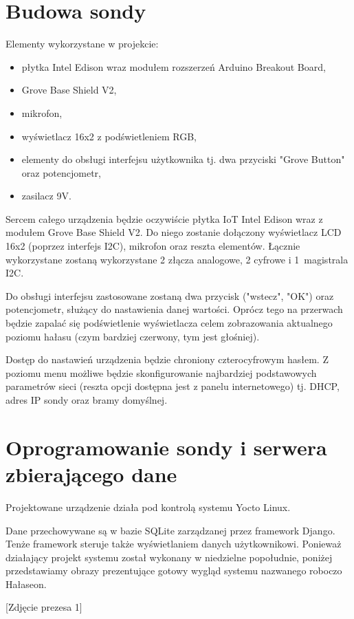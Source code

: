 \documentclass[12pt, a4paper]{article}
\begin{document}
\section{Budowa sondy}

Elementy wykorzystane w projekcie:
\begin{itemize}
\item płytka Intel Edison wraz modułem rozszerzeń Arduino Breakout Board,
\item Grove Base Shield V2,
\item mikrofon,
\item wyświetlacz 16x2 z podświetleniem RGB,
\item elementy do obsługi interfejsu użytkownika tj. dwa przyciski "Grove Button" oraz potencjometr,
\item zasilacz 9V.
\end{itemize}

Sercem całego urządzenia będzie oczywiście płytka IoT Intel Edison wraz z modułem Grove Base Shield V2. Do niego zostanie dołączony wyświetlacz LCD 16x2 (poprzez interfejs I2C), mikrofon oraz reszta elementów. Łącznie wykorzystane zostaną wykorzystane 2 złącza analogowe, 2 cyfrowe i 1~magistrala I2C. 

Do obsługi interfejsu zastosowane zostaną dwa przycisk ("wstecz", "OK") oraz potencjometr, służący do nastawienia danej wartości. Oprócz tego na przerwach będzie zapalać się podświetlenie wyświetlacza celem zobrazowania aktualnego poziomu hałasu (czym bardziej czerwony, tym jest głośniej).

Dostęp do nastawień urządzenia będzie chroniony czterocyfrowym hasłem. Z poziomu menu możliwe będzie skonfigurowanie najbardziej podstawowych parametrów sieci (reszta opcji dostępna jest z panelu internetowego) tj. DHCP, adres IP sondy oraz bramy domyślnej.
\section{Oprogramowanie sondy i serwera zbierającego dane}

Projektowane urządzenie działa pod kontrolą systemu Yocto Linux.

Dane przechowywane są w bazie SQLite zarządzanej przez framework Django. Tenże framework steruje także wyświetlaniem danych użytkownikowi. Ponieważ działający projekt systemu został wykonany w niedzielne popołudnie, poniżej przedstawiamy obrazy prezentujące gotowy wygląd systemu nazwanego roboczo Hałaseon.

[Zdjęcie prezesa 1]
 
\end{document}
